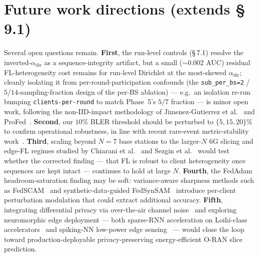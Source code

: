 \documentclass[journal]{IEEEtran}
\newcommand{\alphadir}{\ensuremath{\alpha_{\mathrm{dir}}}}
\begin{document}
\section{Future work directions (extends \S\,9.1)}\label{app:future}

Several open questions remain. \textbf{First}, the run-level controls (\S\,7.1) resolve the inverted-$\alphadir$ as a sequence-integrity artifact, but a small (${\sim}0.002$ AUC) residual FL-heterogeneity cost remains for run-level Dirichlet at the most-skewed $\alphadir$; cleanly isolating it from per-round-participation confounds (the \lstinline|sub_per_bs=2| / $5/14$-sampling-fraction design of the per-BS ablation) --- e.g.\ an isolation re-run bumping \lstinline|clients-per-round| to match Phase~5's $5/7$ fraction --- is minor open work, following the non-IID-impact methodology of Jimenez-Gutierrez et al.~\cite{JimenezGutierrez2025_NonIID} and ProFed~\cite{ProFed2025}. \textbf{Second}, our $10\%$ BLER threshold should be perturbed to $\{5, 15, 20\}\%$ to confirm operational robustness, in line with recent rare-event metric-stability work~\cite{arXiv2504_16185}. \textbf{Third}, scaling beyond $N = 7$ base stations to the larger-$N$ 6G slicing and edge-FL regimes studied by Chiarani et al.~\cite{Chiarani2025} and Sezgin et al.~\cite{Sezgin2025} would test whether the corrected finding --- that FL is robust to client heterogeneity once sequences are kept intact --- continues to hold at large $N$. \textbf{Fourth}, the FedAdam headroom-saturation finding may be soft: variance-aware sharpness methods such as FedSCAM~\cite{FedSCAM2026} and synthetic-data-guided FedSynSAM~\cite{FedSynSAM2026} introduce per-client perturbation modulation that could extract additional accuracy. \textbf{Fifth}, integrating differential privacy via over-the-air channel noise~\cite{arXiv2510_23463} and exploring neuromorphic edge deployment --- both sparse-RNN acceleration on Loihi-class accelerators~\cite{arXiv2502_01330} and spiking-NN low-power edge sensing~\cite{arXiv2604_27004} --- would close the loop toward production-deployable privacy-preserving energy-efficient O-RAN slice prediction.




\end{document}
